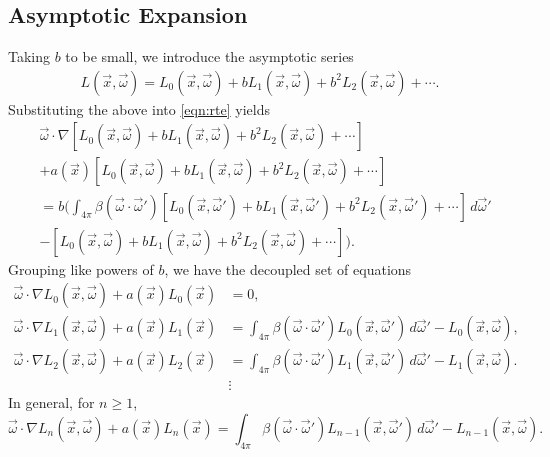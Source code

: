 \subsection{Asymptotic Expansion}
Taking $b$ to be small, we introduce the asymptotic series
\newcommand{\Lasym}{L_0(\vec{x},\vec{\omega}) + b L_1(\vec{x},\vec{\omega}) + b^2 L_2(\vec{x},\vec{\omega}) + \cdots}
\newcommand{\Lasyms}{L_0(\vec{x_s},\vec{\omega}) + b L_1(\vec{x_s},\vec{\omega}) + b^2 L_2(\vec{x_s},\vec{\omega}) + \cdots}
\newcommand{\Lasymp}{L_0(\vec{x},\vec{\omega}') + b L_1(\vec{x},\vec{\omega}') + b^2 L_2(\vec{x},\vec{\omega}') + \cdots}
\begin{align*}
  L(\vec{x},\vec{\omega}) = \Lasym.
\end{align*}
Substituting the above into \eqref{eqn:rte} yields
\begin{align*}
    &\vec{\omega} \cdot \nabla \left[ \Lasym \right] \\
    &+ a(\vec{x}) \left[ \Lasym \right] \\
    &= b\Bigg(
      \int_{4\pi} \beta(\vec{\omega}\cdot\vec{\omega}')
      \left[ \Lasymp \right] \, d\vec{\omega}' \\
    &- \left[ \Lasym \right]
    \Bigg).
\end{align*}
Grouping like powers of $b$, we have the decoupled set of equations
\begin{align}
  \vec{\omega} \cdot \nabla L_0(\vec{x}, \vec{\omega}) + a(\vec{x})L_0(\vec{x}) &= 0,
  \label{eqn:asymptotics_0}\\
  \vec{\omega} \cdot \nabla L_1(\vec{x}, \vec{\omega}) + a(\vec{x})L_1(\vec{x})
  &= \int_{4\pi} \beta(\vec{\omega}\cdot\vec{\omega}') L_0(\vec{x}, \vec{\omega}')\,d\vec{\omega}' - L_0(\vec{x}, \vec{\omega}), \nonumber\\
  \vec{\omega} \cdot \nabla L_2(\vec{x}, \vec{\omega}) + a(\vec{x})L_2(\vec{x})
  &= \int_{4\pi} \beta(\vec{\omega}\cdot\vec{\omega}') L_1(\vec{x}, \vec{\omega}')\,d\vec{\omega}' - L_1(\vec{x}, \vec{\omega}). \nonumber \\
  &\vdots \nonumber
\end{align}
In general, for $n \geq 1$,
\begin{equation}
  \vec{\omega} \cdot \nabla L_n(\vec{x}, \vec{\omega}) + a(\vec{x})L_n(\vec{x})
  = \int_{4\pi} \beta(\vec{\omega}\cdot\vec{\omega}') L_{n-1}(\vec{x}, \vec{\omega}')\,d\vec{\omega}' - L_{n-1}(\vec{x}, \vec{\omega}).
  \label{eqn:asymptotics_n}
\end{equation}

